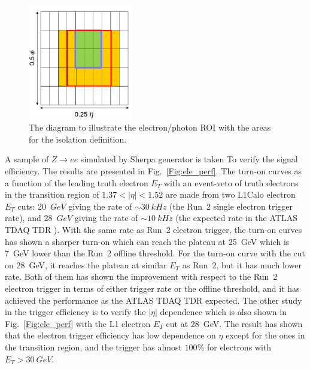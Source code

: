 \begin{figure}[!h]                
	\includegraphics[width=0.4\textwidth]{Chapter6/ele_iso.png}
	\begin{center}
		\caption{The diagram to illustrate the electron/photon ROI with the areas for the isolation definition.}
		\label{Fig:ele_iso}            
	\end{center}
\end{figure}
\noindent
A sample of $Z\to ee$ simulated by Sherpa generator is taken To verify the signal efficiency. The results are presented in Fig.~\ref{Fig:ele_perf}. The turn-on curves as a function of the leading truth electron $E_T$ with an event-veto of truth electrons in the transition region of $1.37<|\eta|<1.52$ are made from two L1Calo electron $E_{T}$ cuts: 20~$GeV$ giving the rate of $\sim30~kHz$ (the Run~2 single electron trigger rate), and 28~$GeV$ giving the rate of $\sim10~kHz$ (the expected rate in the ATLAS TDAQ TDR \cite{Aad:1602235}). With the same rate as Run~2 electron trigger, the turn-on curves has shown a sharper turn-on which can reach the plateau at 25~GeV which is 7~GeV lower than the Run~2 offline threshold. For the turn-on curve with the cut on 28~GeV, it reaches the plateau at similar $E_{T}$ as Run~2, but it has much lower rate. Both of them has shown the improvement with respect to the Run~2 electron trigger in terms of either trigger rate or the offline threshold, and it has achieved the performance as the ATLAS TDAQ TDR\cite{Aad:1602235} expected. The other study in the trigger efficiency is to verify the $|\eta|$ dependence which is also shown in Fig.~\ref{Fig:ele_perf} with the L1 electron $E_{T}$ cut at 28~GeV. The result has shown that the electron trigger efficiency has low dependence on $\eta$ except for the ones in the transition region, and the trigger has almost $100\%$ for electrons with $E_{T}>30~GeV$.
